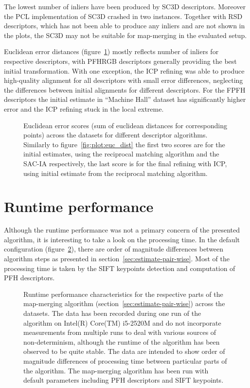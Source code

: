 The lowest number of inliers have been produced by \gls{SC3D} descriptors. Moreover the \gls{PCL} implementation of \gls{SC3D} crashed in two instances. Together with \gls{RSD} descriptors, which has not been able to produce any inliers and are not shown in the plots, the \gls{SC3D} may not be suitable for map-merging in the evaluated setup.

Euclidean error distances (figure~\ref{fig:plot:desc_dist}) mostly reflects number of inliers for respective descriptors, with \gls{PFHRGB} descriptors generally providing the best initial transformation. With one exception, the \gls{ICP} refining was able to produce high-quality alignment for all descriptors with small error differences, neglecting the differences between initial alignments for different descriptors. For the \gls{FPFH} descriptors the initial estimate in ``Machine Hall'' dataset has significantly higher error and the \gls{ICP} refining stuck in the local extreme.

\begin{figure}
  \centering
  
  \caption{Euclidean error scores (sum of euclidean distances for corresponding points) across the datasets for different descriptor algorithms. Similarly to figure~\ref{fig:plot:euc_dist} the first two scores are for the initial estimates, using the reciprocal matching algorithm and the \gls{SAC-IA} respectively, the last score is for the final refining with \gls{ICP}, using initial estimate from the reciprocal matching algorithm.}
  \label{fig:plot:desc_dist}
\end{figure}

\section{Runtime performance}
\label{sec:runtime-perf}

Although the runtime performance was not a primary concern of the presented algorithm, it is interesting to take a look on the processing time. In the default configuration (figure~\ref{fig:plot:perf}), there are order of magnitude differences between algorithm steps as presented in section~\ref{sec:estimate-pair-wise}. Most of the processing time is taken by the \gls{SIFT} keypoints detection and computation of \gls{PFH} descriptors.

\begin{figure}
  \centering
  
  \caption{Runtime performance characteristics for the respective parts of the map-merging algorithm (section~\ref{sec:estimate-pair-wise}) across the datasets. The data has been recorded during one run of the algorithm on Intel(R) Core(TM) i5-2520M and do not incorporate measurements from multiple runs to deal with various sources of non-determinism, although the runtime of the algorithm has been observed to be quite stable. The data are intended to show order of magnitude differences of processing time between particular parts of the algorithm. The map-merging algorithm has been run with default parameters including \gls{PFH} descriptors and \gls{SIFT} keypoints.}
  \label{fig:plot:perf}
\end{figure}

